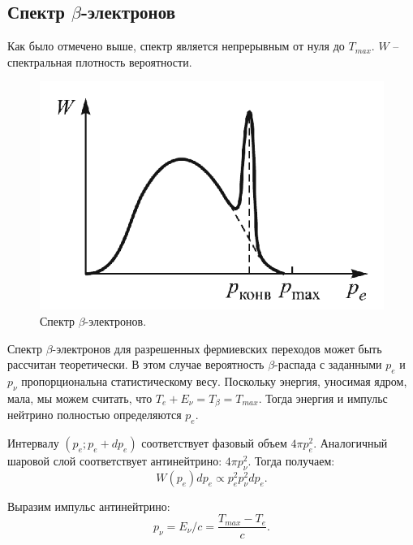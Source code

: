 \documentclass[12pt,a4paper]{article}
\begin{document}
	\subsection*{Спектр $\beta$-электронов}
	
	Как было отмечено выше, спектр является непрерывным от нуля до $T_{max}$. $W$ -- спектральная плотность вероятности.
	
	\begin{figure}
		\includegraphics[scale=0.6]{res/spectrum.png}
		\caption{Спектр $\beta$-электронов.}
		\label{fig:spectrum}
		\vspace{0pt}
	\end{figure}

	Спектр $\beta$-электронов для разрешенных фермиевских переходов может быть рассчитан теоретически. В этом случае вероятность $\beta$-распада с заданными $p_e$ и $p_{\nu}$ пропорциональна статистическому весу. Поскольку энергия, уносимая ядром, мала, мы можем считать, что $T_e + E_{\nu} = T_{\beta} = T_{max}$. Тогда энергия и импульс нейтрино полностью определяются $p_e$.
	
	Интервалу $(p_e; p_e + d p_e)$ соответствует фазовый объем $4 \pi p_e^2$. Аналогичный шаровой слой соответствует антинейтрино: $4 \pi p_{\nu}^2$. Тогда получаем:
	\begin{equation}
		W(p_e) dp_e \propto p_e^2 p_{\nu}^2 dp_e.
		\label{eq:probability}
	\end{equation}
	
	Выразим импульс антинейтрино:
	\begin{equation}
		p_{\nu} = E_{\nu} / c = \frac{T_{max} - T_e}{c}.
		\label{eq:impulse_nu}
	\end{equation}
	
\end{document}
